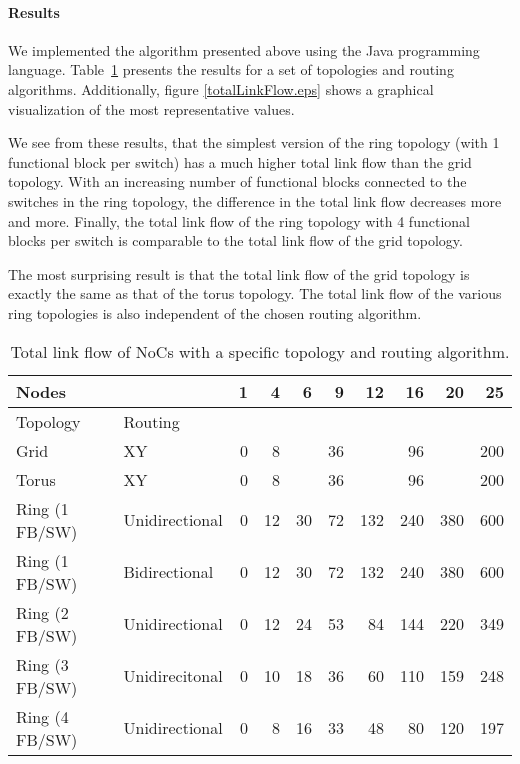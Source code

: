 \paragraph{\label{linkFlowResults}Results}
We implemented the algorithm presented above using the Java programming language. Table~\ref{totalLinkFlowResults} presents the results for a set of topologies and routing algorithms. Additionally, figure \ref{totalLinkFlow.eps} shows a graphical visualization of the most representative values.

We see from these results, that the simplest version of the ring topology (with 1 functional block per switch) has a much higher total link flow than the grid topology. With an increasing number of functional blocks connected to the switches in the ring topology, the difference in the total link flow decreases more and more. Finally, the total link flow of the ring topology with 4 functional blocks per switch is comparable to the total link flow of the grid topology.

The most surprising result is that the total link flow of the grid topology is exactly the same as that of the torus topology. The total link flow of the various ring topologies is also independent of the chosen routing algorithm.

\begin{table}
\begin{center}
\begin{tabular}{|l|l|rrrrrrrr|}
\hline
	\multicolumn{2}{|l|}{Nodes} & 1 & 4 & 6 & 9 & 12 & 16 & 20  & 25 \\
\hline
\hline
	Topology & Routing & & & & & & & & \\
\hline
	Grid & XY & 0 & 8 & & 36 & & 96 & & 200 \\
	Torus & XY & 0 & 8 & & 36 & & 96 & & 200 \\
	Ring (1 FB/SW) & Unidirectional & 0 & 12 & 30 & 72 & 132 & 240 & 380 & 600\\
	Ring (1 FB/SW) & Bidirectional & 0 & 12 & 30 & 72 & 132 & 240 & 380 & 600\\
	Ring (2 FB/SW) & Unidirectional &0& 12 & 24 & 53 & 84 & 144 & 220 & 349\\
	Ring (3 FB/SW) & Unidirecitonal &0 & 10 & 18 & 36 & 60 & 110 & 159 & 248\\
	Ring (4 FB/SW) & Unidirectional &0 & 8 & 16 & 33 & 48 & 80 & 120 & 197\\
\hline
\end{tabular}
\caption{Total link flow of NoCs with a specific topology and routing algorithm.}
\label{totalLinkFlowResults}
\end{center}
\end{table}

